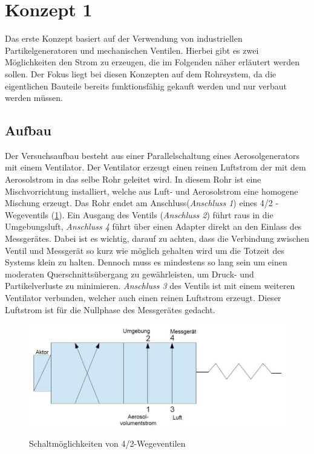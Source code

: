 \section{Konzept 1}
Das erste Konzept basiert auf der Verwendung von industriellen Partikelgeneratoren und mechanischen Ventilen. Hierbei gibt es zwei M\"{o}glichkeiten den Strom zu erzeugen, die im Folgenden n\"{a}her erl\"{a}utert werden sollen. Der Fokus liegt bei diesen Konzepten auf dem Rohrsystem, da die eigentlichen Bauteile bereits funktionsf\"{a}hig gekauft werden und nur verbaut werden m\"{u}ssen.

\subsection{Aufbau}
Der Versuchsaufbau besteht aus einer Parallelschaltung eines Aerosolgenerators mit einem Ventilator. Der Ventilator erzeugt einen reinen Luftstrom der mit dem Aerosolstrom in das selbe Rohr geleitet wird. In diesem Rohr ist eine Mischvorrichtung installiert, welche aus Luft- und Aerosolstrom eine homogene Mischung erzeugt. Das Rohr endet am Anschluss(\textit{Anschluss 1}) eines 4/2 - Wegeventils (\ref{fig:ventil}). Ein Ausgang des Ventils (\textit{Anschluss 2}) f\"{u}hrt raus in die Umgebungsluft, \textit{Anschluss 4} f\"{u}hrt \"{u}ber einen Adapter direkt an den Einlass des Messger\"{a}tes. Dabei ist es wichtig, darauf zu achten, dass die Verbindung zwischen Ventil und Messger\"{a}t so kurz wie m\"{o}glich gehalten wird um die Totzeit des Systems klein zu halten. Dennoch muss es mindestens so lang sein um einen moderaten Querschnitts\"{u}bergang zu gew\"{a}hrleisten, um Druck- und Partikelverluste zu minimieren. \textit{Anschluss 3} des Ventils ist mit einem weiteren Ventilator verbunden, welcher auch einen reinen Luftstrom erzeugt. Dieser Luftstrom ist f\"{u}r die Nullphase des Messger\"{a}tes gedacht.
\begin{figure}[H]
        \myfloatalign
        {\includegraphics[width=.9\linewidth]{gfx/concepts/ventil_feder.jpg}} \quad
        \caption[Schaltm\"{o}glichkeiten von 4/2-Wegeventilen]
        {Schaltm\"{o}glichkeiten von 4/2-Wegeventilen}
        \label{fig:ventil}
\end{figure}

